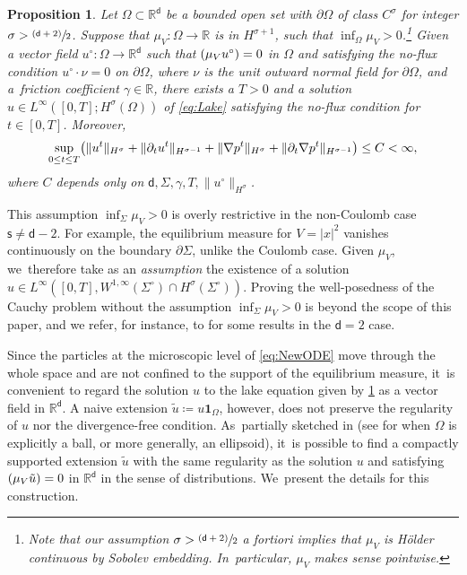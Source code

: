 \documentclass[JEP,XML,SOM,Unicode,published]{cedram}
\newcommand{\psfrac}[2]{\sfrac{(#1)}{#2}}
\newcommand{\Sigmacirc}{\Sigma^\circ}
\theoremstyle{plain}
\newtheorem{prop}[thm]{Proposition}
\theoremstyle{definition}
\DeclarePairedDelimiter{\pa}{\lparen}{\rparen}
\let\div\relax
\DeclareMathOperator{\div}{\mathrm{div}}
\newcommand{\R}{{\mathbb{R}}}
\let\ga\gamma
\let\Om\Omega
\let\p\partial
\let\tl\tilde
\newcommand{\indic}{\mathbf{1}}
\renewcommand{\d}{\mathsf{d}}
\newcommand{\s}{\mathsf{s}}
\begin{document}
\begin{prop}\label{prop:LakeWP}
Let $\Omega\subset\R^\d$ be a bounded open set with $\p\Om$ of class $C^{\sigma}$ for integer $\sigma>\psfrac{\d+2}{2}$. Suppose that $\mu_V: \Om\to\R$ is in $H^{\sigma+1}$, such that $\inf_{\Om}\mu_V > 0$.\footnote{Note that our assumption $\sigma>\psfrac{\d+2}{2}$ a fortiori implies that $\mu_V$ is Hölder continuous by Sobolev embedding. In~particular, $\mu_V$ makes sense pointwise.} Given a vector field $u^\circ:\Om\to\R^\d$ such that $\div(\mu_V u^\circ) =0$ in $\Omega$ and satisfying the no-flux condition $u^\circ\cdot\nu=0$ on $\p\Om$, where $\nu$ is the unit outward normal field for $\p\Om$, and a~friction coefficient $\ga\in\R$, there exists a $T>0$ and a solution $u\in L^\infty([0,T]; H^\sigma(\Om))$ of \eqref{eq:Lake} satisfying the no-flux condition for $t\in[0,T]$. Moreover,\vspace*{-3pt}
\begin{equation*}
\sup_{0\leq t\leq T} \pa*{\|u^t\|_{H^\sigma} + \|\p_t u^t\|_{H^{\sigma-1}} + \|\nabla p^t\|_{H^\sigma} + \|\p_t\nabla p^t\|_{H^{\sigma-1}}} \leq C<\infty,
\end{equation*}
where $C$ depends only on $\d,\Sigma,\ga,T,\|u^\circ\|_{H^\sigma}$.
\end{prop}

This assumption $\inf_{\Sigma} \mu_V >0$ is overly restrictive in the non-Coulomb case $\s\neq\d-2$. For example, the equilibrium measure for $V=|x|^2$ vanishes continuously on the boundary $\p\Sigma$, unlike the Coulomb case. Given $\mu_V$, we~therefore take as an \emph{assumption} the existence of a solution $u\in L^\infty([0,T], W^{1,\infty}(\Sigmacirc) \cap H^\sigma(\Sigmacirc))$. Proving the well-posedness of the Cauchy problem without the assumption $\inf_{\Sigma} \mu_V >0$ is beyond the scope of this paper, and we refer, for instance, to \cite{BM2006, aTL2023} for some results in the $\d=2$ case.

Since the particles at the microscopic level of \eqref{eq:NewODE} move through the whole space and are not confined to the support of the equilibrium measure, it~is convenient to regard the solution $u$ to the lake equation given by \cref{prop:LakeWP} as a vector field in $\R^\d$. A naive extension $\tl u \coloneqq u\indic_{\Omega}$, however, does not preserve the regularity of $u$ nor the divergence-free condition. As~partially sketched in \cite[Rem.\,B.2]{BCGM2015} (see \cite[Lem.\,B.1]{BCGM2015} for when $\Omega$ is explicitly a ball, or more generally, an ellipsoid), it~is possible to find a compactly supported extension $\tl u$ with the same regularity as the solution $u$ and satisfying $\div(\mu_V\tl u)=0$ in $\R^\d$ in the sense of distributions. We~present the details for this construction.
\end{document}
